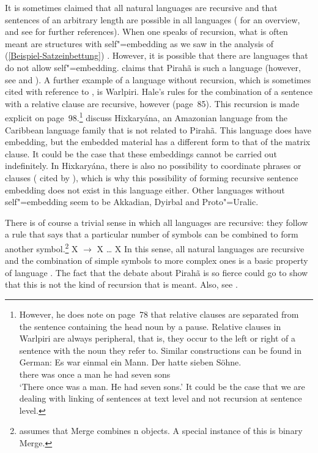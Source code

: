 It is sometimes claimed that all natural languages are recursive and that sentences of an arbitrary
length are possible in all languages (\citealp*[]{HNG2005a} for an overview, and see  for further references). When one speaks of recursion,
what is often meant are structures with self"=embedding as we saw in the analysis of (\ref{Beispiel-Satzeinbettung}) \citep{Fitch2010a}. 
However, it is possible that there are languages that do not allow self"=embedding. \citet{Everett2005a-u} claims that
Pirah{\~a} is such a language (however, see  and
). 
A further example of a language without recursion, which is sometimes cited with reference to , is Warlpiri.
Hale's rules for the combination of a sentence with a relative clause are recursive, however (page~85). This recursion is made
explicit on page~98.\footnote{%
	However, he does note on page~78 that relative clauses are separated from the sentence
        containing the head noun by a pause. Relative clauses in Warlpiri are always peripheral, that is, they occur to the left or right of a sentence with the noun they refer to. Similar
	constructions can be found in German:
\ea
\gll Es war einmal ein Mann. Der hatte sieben Söhne.\\
	 there was once a man he had seven sons\\
\glt `There once was a man. He had seven sons.'
\z
It could be the case that we are dealing with linking of sentences at text level and not recursion at sentence level.
} \citet[]{PS2010a} discuss Hixkaryána, an Amazonian language from the Caribbean language
family that is not related to Pirah{\~a}. This language does have embedding, but the embedded
material has a different form to that of the matrix clause. It could be the case that these embeddings cannot be carried out indefinitely. In Hixkaryána,
there is also no possibility to coordinate phrases or clauses ( cited by ), which is why this possibility of forming recursive sentence embedding does not
exist in this language either. Other languages without self"=embedding seem to be Akkadian, Dyirbal and Proto"=Uralic.
	
There is of course a trivial sense in which all languages are recursive: they follow a rule that says that a particular number of symbols can be combined
to form another symbol.\footnote{
  \citet[]{Chomsky2005a} assumes that Merge combines n objects. A special instance of this is binary Merge.
}
\ea
X $\to$ X \ldots{} X
\z
In this sense, all natural languages are recursive and the combination of simple symbols to more complex ones is a basic property of language \citep[]{Hockett60a}. The fact that the debate about Pirah{\~a} is so fierce could go to show that this is not the kind of recursion that is meant.
Also, see \citet{Fitch2010a}.

